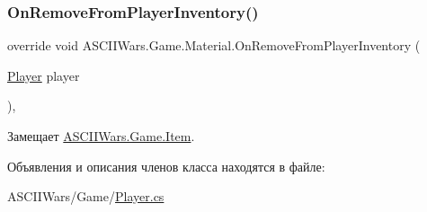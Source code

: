 \subsubsection{\texorpdfstring{On\+Remove\+From\+Player\+Inventory()}{OnRemoveFromPlayerInventory()}}
{\footnotesize\ttfamily override void A\+S\+C\+I\+I\+Wars.\+Game.\+Material.\+On\+Remove\+From\+Player\+Inventory (\begin{DoxyParamCaption}\item[{\hyperlink{class_a_s_c_i_i_wars_1_1_game_1_1_player}{Player}}]{player }\end{DoxyParamCaption})\hspace{0.3cm}{\ttfamily [inline]}, {\ttfamily [virtual]}}



Замещает \hyperlink{class_a_s_c_i_i_wars_1_1_game_1_1_item_a52412546f837bfc65a3aa9d728fa142f}{A\+S\+C\+I\+I\+Wars.\+Game.\+Item}.



Объявления и описания членов класса находятся в файле\+:\begin{DoxyCompactItemize}
\item 
A\+S\+C\+I\+I\+Wars/\+Game/\hyperlink{_player_8cs}{Player.\+cs}\end{DoxyCompactItemize}
